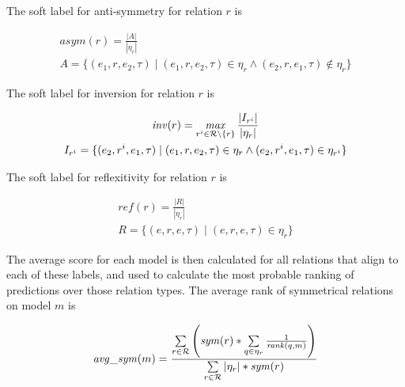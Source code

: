 \noindent
The soft label for anti-symmetry for relation $r$ is

\begin{equation}
\begin{gathered}
\mathit{asym}(r) = \frac{|A|}{|\eta_r|}\\
A = \{ (e_1, r, e_2, \tau) \mid (e_1, r, e_2, \tau) \in \eta_r \wedge (e_2, r, e_1, \tau) \notin \eta_r \}
\end{gathered}
\end{equation}

\noindent
The soft label for inversion for relation $r$ is

\begin{equation}
\begin{gathered}
\mathit{inv}(r) = \operatorname*{\mathit{max}}\limits_{r^i \in \mathcal{R} \setminus \{r\} } \frac{|I_{r^i}|}{|\eta_r|}\\
I_{r^i} = \{ (e_2, r^i, e_1, \tau) \mid (e_1, r, e_2, \tau) \in \eta_r \wedge (e_2, r^i, e_1, \tau) \in \eta_{r^i} \}
\end{gathered}
\end{equation}

\noindent
The soft label for reflexitivity for relation $r$ is

\begin{equation}
\begin{gathered}
\mathit{ref}(r) = \frac{|R|}{|\eta_r|}\\
R = \{ (e, r, e, \tau) \mid (e, r, e, \tau) \in \eta_r \}
\end{gathered}
\end{equation}

The average score for each model is then calculated for all relations that align to each of these labels, and used to calculate the most probable ranking of predictions over those relation types. The average rank of symmetrical relations on model $m$ is


\begin{equation}
\mathit{avg\_sym}(m) = 
\frac{ \sum\limits_{r \in \mathcal{R}} \left( \mathit{sym}(r) * \sum\limits_{q \in \eta_r} \frac{1}{\mathit{rank}(q , m)} \right) }
{ \sum\limits_{r \in \mathcal{R}} |\eta_r| * \mathit{sym}(r) }
\end{equation}

